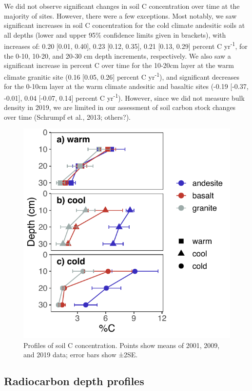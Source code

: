 \documentclass[english,man,floatsintext]{apa6}
\begin{document}
We did not observe significant changes in soil C concentration over time at the majority of sites. However, there were a few exceptions. Most notably, we saw significant increases in soil C concentration for the cold climate andesitic soils at all depths (lower and upper 95\% confidence limits given in brackets), with increases of: 0.20 {[}0.01, 0.40{]}, 0.23 {[}0.12, 0.35{]}, 0.21 {[}0.13, 0.29{]} percent C yr\textsuperscript{-1}, for the 0-10, 10-20, and 20-30 cm depth increments, respectively. We also saw a significant increase in percent C over time for the 10-20cm layer at the warm climate granitic site (0.16 {[}0.05, 0.26{]} percent C yr\textsuperscript{-1}), and significant decreases for the 0-10cm layer at the warm climate andesitic and basaltic sites (-0.19 {[}-0.37, -0.01{]}, 0.04 {[}-0.07, 0.14{]} percent C yr\textsuperscript{-1}). However, since we did not measure bulk density in 2019, we are limited in our assessment of soil carbon stock changes over time (Schrumpf et al., 2013; others?).



\begin{figure}

{\centering \includegraphics[width=0.65\linewidth,height=0.65\textheight]{sra-blk-inc-19_files/figure-latex/plot-C-profiles-1} 

}

\caption{Profiles of soil C concentration. Points show means of 2001, 2009, and 2019 data; error bars show ±2SE.}\label{fig:plot-C-profiles}
\end{figure}

\hypertarget{radiocarbon-depth-profiles}{%
\subsection{Radiocarbon depth profiles}\label{radiocarbon-depth-profiles}}
\end{document}
